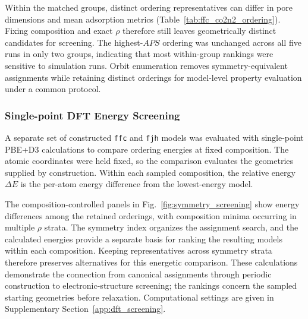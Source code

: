 \documentclass[a5paper, 10pt]{article}
\begin{document}
Within the matched groups, distinct ordering representatives can differ in pore dimensions and mean adsorption metrics (Table~\ref{tab:ffc_co2n2_ordering}). Fixing composition and exact $\rho$ therefore still leaves geometrically distinct candidates for screening. The highest-$APS$ ordering was unchanged across all five runs in only two groups, indicating that most within-group rankings were sensitive to simulation runs. Orbit enumeration removes symmetry-equivalent assignments while retaining distinct orderings for model-level property evaluation under a common protocol.


\subsubsection{Single-point DFT Energy Screening}

A separate set of constructed \texttt{ffc} and \texttt{fjh} models was evaluated with single-point PBE+D3 calculations to compare ordering energies at fixed composition. The atomic coordinates were held fixed, so the comparison evaluates the geometries supplied by construction. Within each sampled composition, the relative energy $\Delta E$ is the per-atom energy difference from the lowest-energy model.

The composition-controlled panels in Fig.~\ref{fig:symmetry_screening} show energy differences among the retained orderings, with composition minima occurring in multiple $\rho$ strata. The symmetry index organizes the assignment search, and the calculated energies provide a separate basis for ranking the resulting models within each composition. Keeping representatives across symmetry strata therefore preserves alternatives for this energetic comparison. These calculations demonstrate the connection from canonical assignments through periodic construction to electronic-structure screening; the rankings concern the sampled starting geometries before relaxation. Computational settings are given in Supplementary Section~\ref{app:dft_screening}.
\end{document}
